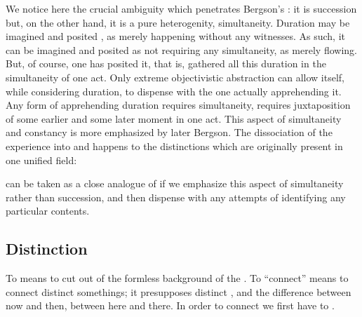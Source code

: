 {  We notice here the crucial ambiguity which penetrates Bergson's
  : it is succession but, on the other hand, it is a pure
  heterogenity, simultaneity.  
  Duration may be imagined and posited , as merely happening
   without any witnesses. As such, it can be imagined and posited
  as not requiring any simultaneity, as merely flowing. But, of course, one has
  posited it, that is, gathered all this duration in the simultaneity of one
  act. Only extreme objectivistic abstraction can allow itself, while
  considering duration, to dispense with the one actually apprehending it.  Any
  form of apprehending duration requires simultaneity, requires juxtaposition of
  some earlier and some later moment in one act.  This aspect of simultaneity
  and constancy is more emphasized by later Bergson.   The dissociation of the experience into
   and  happens to the distinctions which are originally
  present in one unified field: 
  
   can be taken as a close analogue of  if we emphasize
  this aspect of simultaneity rather than succession, and then dispense with any
  attempts of identifying any particular contents.
}


\subsection{Distinction}
\pa\label{th:cut} To  means to {cut} out of the formless
background of the \pexp. To ``connect'' means to connect distinct somethings; it
presupposes distinct , and the difference between {now} and
{then}, between {here} and {there}.  In order to connect we first have
to .

